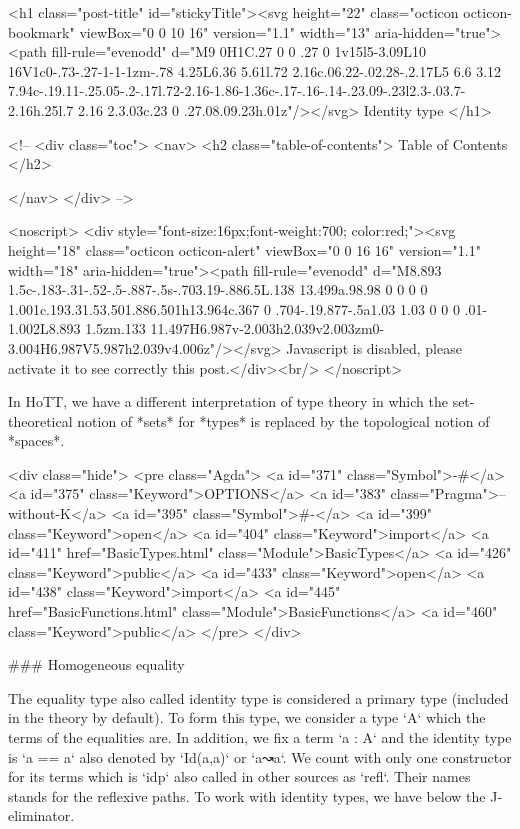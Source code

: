   <h1 class="post-title" id="stickyTitle"><svg height="22" class="octicon octicon-bookmark" viewBox="0 0 10 16" version="1.1" width="13" aria-hidden="true"><path fill-rule="evenodd" d="M9 0H1C.27 0 0 .27 0 1v15l5-3.09L10 16V1c0-.73-.27-1-1-1zm-.78 4.25L6.36 5.61l.72 2.16c.06.22-.02.28-.2.17L5 6.6 3.12 7.94c-.19.11-.25.05-.2-.17l.72-2.16-1.86-1.36c-.17-.16-.14-.23.09-.23l2.3-.03.7-2.16h.25l.7 2.16 2.3.03c.23 0 .27.08.09.23h.01z"/></svg> Identity type
  </h1>

  <!-- 
  <div class="toc">
    <nav>
    <h2 class="table-of-contents"> Table of Contents </h2>
      

    </nav>
  </div>
   -->

  <noscript>
  <div style="font-size:16px;font-weight:700; color:red;"><svg height="18" class="octicon octicon-alert" viewBox="0 0 16 16" version="1.1" width="18" aria-hidden="true"><path fill-rule="evenodd" d="M8.893 1.5c-.183-.31-.52-.5-.887-.5s-.703.19-.886.5L.138 13.499a.98.98 0 0 0 0 1.001c.193.31.53.501.886.501h13.964c.367 0 .704-.19.877-.5a1.03 1.03 0 0 0 .01-1.002L8.893 1.5zm.133 11.497H6.987v-2.003h2.039v2.003zm0-3.004H6.987V5.987h2.039v4.006z"/></svg> Javascript is disabled, please activate it to see correctly this post.</div><br/>
  </noscript>

  In HoTT, we have a different interpretation of type theory in which the
set-theoretical notion of *sets* for *types* is replaced by the topological
notion of *spaces*.

<div class="hide">
<pre class="Agda">
<a id="371" class="Symbol">{-#</a> <a id="375" class="Keyword">OPTIONS</a> <a id="383" class="Pragma">--without-K</a> <a id="395" class="Symbol">#-}</a>
<a id="399" class="Keyword">open</a> <a id="404" class="Keyword">import</a> <a id="411" href="BasicTypes.html" class="Module">BasicTypes</a>     <a id="426" class="Keyword">public</a>
<a id="433" class="Keyword">open</a> <a id="438" class="Keyword">import</a> <a id="445" href="BasicFunctions.html" class="Module">BasicFunctions</a> <a id="460" class="Keyword">public</a>
</pre>
</div>

### Homogeneous equality

The equality type also called identity type is considered a primary type
(included in the theory by default). To form this type, we consider a type `A`
which the terms of the equalities are. In addition, we fix a term `a : A` and
the identity type is `a == a` also denoted by `Id(a,a)` or `a↝a`. We count with
only one constructor for its terms which is `idp` also called in other sources
as `refl`. Their names stands for the reflexive paths. To work with identity
types, we have below the J-eliminator.

